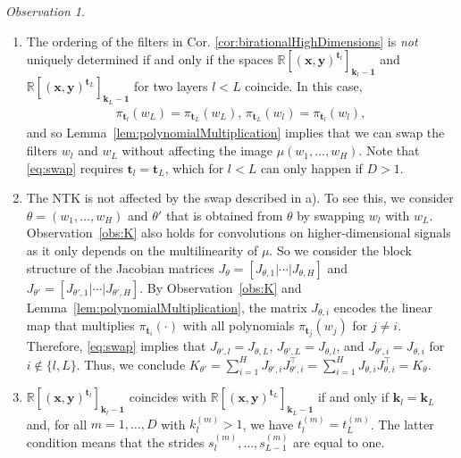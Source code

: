 \documentclass[twoside]{article}
\theoremstyle{definition}
\theoremstyle{remark}
\newtheorem{observation}[theorem]{Observation}
\begin{document}
\begin{observation} \label{obs:swap}
\begin{enumerate}
    \item[a)]
    The ordering of the filters in Cor. \ref{cor:birationalHighDimensions} is \emph{not} uniquely determined if and only if the spaces $\mathbb{R}[(\boldsymbol{x},\boldsymbol{y})^{\boldsymbol{t}_l}]_{\boldsymbol{k}_l-\boldsymbol{1}}$ and $\mathbb{R}[(\boldsymbol{x},\boldsymbol{y})^{\boldsymbol{t}_L}]_{\boldsymbol{k}_L-\boldsymbol{1}}$ for two layers $l<L$ coincide.
    In this case,
     \begin{align}\label{eq:swap}
        \pi_{\boldsymbol{t}_l}(w_L) = \pi_{\boldsymbol{t}_L}(w_L), \, \pi_{\boldsymbol{t}_L}(w_l) = \pi_{\boldsymbol{t}_l}(w_l),
    \end{align} and so Lemma~\ref{lem:polynomialMultiplication} implies that we can 
     swap the filters $w_l$ and $w_L$ without affecting the image $\mu(w_1, \ldots, w_H)$. Note that \eqref{eq:swap} requires  $\boldsymbol{t}_l = \boldsymbol{t}_L$, which for $l < L$ can only happen if $D > 1$.
     \item[b)] The NTK is not affected by the swap described in a). 
     To see this, we consider $\theta = (w_1, \ldots, w_H)$ and $\theta'$ that is obtained from  $\theta$ by swapping $w_l$ with $w_L$.
     Observation~\ref{obs:K} also holds for convolutions on higher-dimensional signals as it only depends on the multilinearity of $\mu$.
     So we consider the block structure of the Jacobian matrices $J_\theta = [J_{\theta,1}|\cdots|J_{\theta,H}]$ and $J_{\theta'} = [J_{\theta',1}|\cdots|J_{\theta',H}]$.
     By Observation~\ref{obs:K} and Lemma~\ref{lem:polynomialMultiplication}, the matrix $J_{\theta,i}$ encodes the linear map that multiplies $\pi_{\boldsymbol{t}_i}(\cdot)$ with all polynomials $\pi_{\boldsymbol{t}_j}(w_j)$ for $j \neq i$.
     Therefore, \eqref{eq:swap} implies that $J_{\theta',l} = J_{\theta,L}$, $J_{\theta',L} = J_{\theta,l}$, and $J_{\theta',i} = J_{\theta,i}$ for $i \notin \{l,L \}$.
     Thus, we conclude 
     $K_{\theta'} = \sum_{i=1}^H J_{\theta',i}J_{\theta',i}^\top = \sum_{i=1}^H J_{\theta,i}J_{\theta,i}^\top= K_\theta$.
    \item[c)]
    $\mathbb{R}[(\boldsymbol{x},\boldsymbol{y})^{\boldsymbol{t}_l}]_{\boldsymbol{k}_l-\boldsymbol{1}}$ coincides with $\mathbb{R}[(\boldsymbol{x},\boldsymbol{y})^{\boldsymbol{t}_L}]_{\boldsymbol{k}_L-\boldsymbol{1}}$ if and only if $\boldsymbol{k}_l = \boldsymbol{k}_L$ and, for  all $m = 1, \ldots, D$ with 
    $k^{(m)}_l > 1$, we have $t^{(m)}_l = t^{(m)}_L$.
    The latter condition means that the strides $s^{(m)}_l, \ldots, s^{(m)}_{L-1}$ are equal to one.
\end{enumerate}
\end{observation}
\end{document}
